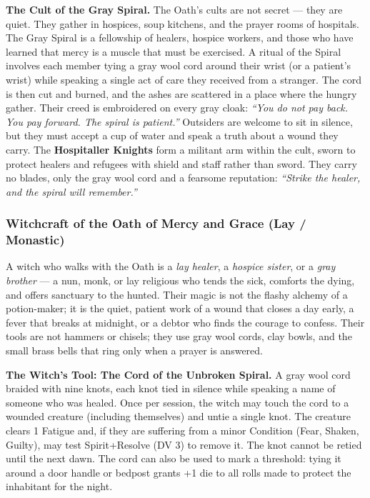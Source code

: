 \textbf{The Cult of the Gray Spiral.} The Oath's cults are not secret --- they are quiet. They gather in hospices, soup kitchens, and the prayer rooms of hospitals. The Gray Spiral is a fellowship of healers, hospice workers, and those who have learned that mercy is a muscle that must be exercised. A ritual of the Spiral involves each member tying a gray wool cord around their wrist (or a patient's wrist) while speaking a single act of care they received from a stranger. The cord is then cut and burned, and the ashes are scattered in a place where the hungry gather. Their creed is embroidered on every gray cloak: \textit{``You do not pay back. You pay forward. The spiral is patient.''} Outsiders are welcome to sit in silence, but they must accept a cup of water and speak a truth about a wound they carry. The \textbf{Hospitaller Knights} form a militant arm within the cult, sworn to protect healers and refugees with shield and staff rather than sword. They carry no blades, only the gray wool cord and a fearsome reputation: \textit{``Strike the healer, and the spiral will remember.''}

\subsubsection*{Witchcraft of the Oath of Mercy and Grace (Lay / Monastic)}

A witch who walks with the Oath is a \textit{lay healer}, a \textit{hospice sister}, or a \textit{gray brother} --- a nun, monk, or lay religious who tends the sick, comforts the dying, and offers sanctuary to the hunted. Their magic is not the flashy alchemy of a potion-maker; it is the quiet, patient work of a wound that closes a day early, a fever that breaks at midnight, or a debtor who finds the courage to confess. Their tools are not hammers or chisels; they use gray wool cords, clay bowls, and the small brass bells that ring only when a prayer is answered.

\textbf{The Witch's Tool: The Cord of the Unbroken Spiral.} A gray wool cord braided with nine knots, each knot tied in silence while speaking a name of someone who was healed. Once per session, the witch may touch the cord to a wounded creature (including themselves) and untie a single knot. The creature clears 1 Fatigue and, if they are suffering from a minor Condition (Fear, Shaken, Guilty), may test Spirit+Resolve (DV 3) to remove it. The knot cannot be retied until the next dawn. The cord can also be used to mark a threshold: tying it around a door handle or bedpost grants +1 die to all rolls made to protect the inhabitant for the night.

